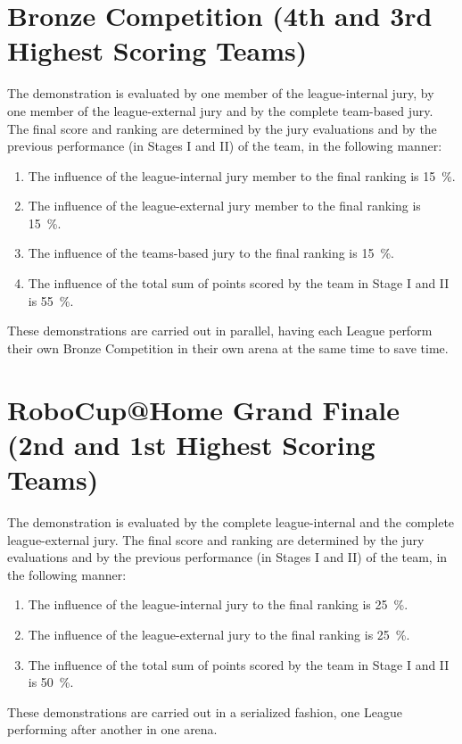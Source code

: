 \section{Bronze Competition (4th and 3rd Highest Scoring Teams)}
The demonstration is evaluated by one member of the league-internal jury, by one member of the league-external jury and by the complete team-based jury.
The final score and ranking are determined by the jury evaluations and by the previous performance (in Stages I and II) of the team, in the following manner:

\begin{enumerate}
  \item The influence of the league-internal jury member to the final ranking is \SI{15}{\percent}.
  \item The influence of the league-external jury member to the final ranking is \SI{15}{\percent}.
  \item The influence of the teams-based jury to the final ranking is \SI{15}{\percent}.
  \item The influence of the total sum of points scored by the team in Stage I and II is \SI{55}{\percent}.
\end{enumerate}

These demonstrations are carried out in parallel, having each League perform their own Bronze Competition in their own arena at the same time to save time.

\section{RoboCup@Home Grand Finale (2nd and 1st Highest Scoring Teams)}
The demonstration is evaluated by the complete league-internal and the complete league-external jury.
The final score and ranking are determined by the jury evaluations and by the previous performance (in Stages I and II) of the team, in the following manner:
  
\begin{enumerate}
  \item The influence of the league-internal jury to the final ranking is \SI{25}{\percent}.
  \item The influence of the league-external jury to the final ranking is \SI{25}{\percent}.
  \item The influence of the total sum of points scored by the team in Stage I and II is \SI{50}{\percent}.
\end{enumerate}

These demonstrations are carried out in a serialized fashion, one League performing after another in one arena.


